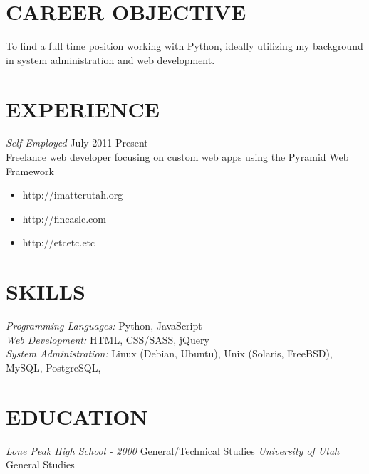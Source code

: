 \documentclass[line,margin]{res}
\begin{document}
\address{parker@parkerpinette.com \\ (801) 638-8611 \\ http://parkerpinette.com \\ https://github.com/ppinette}

\begin{resume}

\section{CAREER OBJECTIVE}To find a full time position working with Python, ideally utilizing my background in system administration and web development.

\section{EXPERIENCE} {\sl Self Employed} \hfill July 2011-Present \\
		Freelance web developer focusing on custom web apps using the Pyramid Web Framework
		\begin{itemize} \itemsep -2pt %
		\item http://imatterutah.org
		\item http://fincaslc.com
		\item http://etcetc.etc
		\end{itemize}


\section{SKILLS} {\sl Programming Languages:} Python, JavaScript\\
		{\sl Web Development:} HTML, CSS/SASS, jQuery\\
		{\sl System Administration:} Linux (Debian, Ubuntu), Unix (Solaris, FreeBSD), MySQL, PostgreSQL,
					

\section{EDUCATION} {\sl Lone Peak High School - 2000} General/Technical Studies
		{\sl University of Utah} General Studies



\end{resume}
\end{document}
